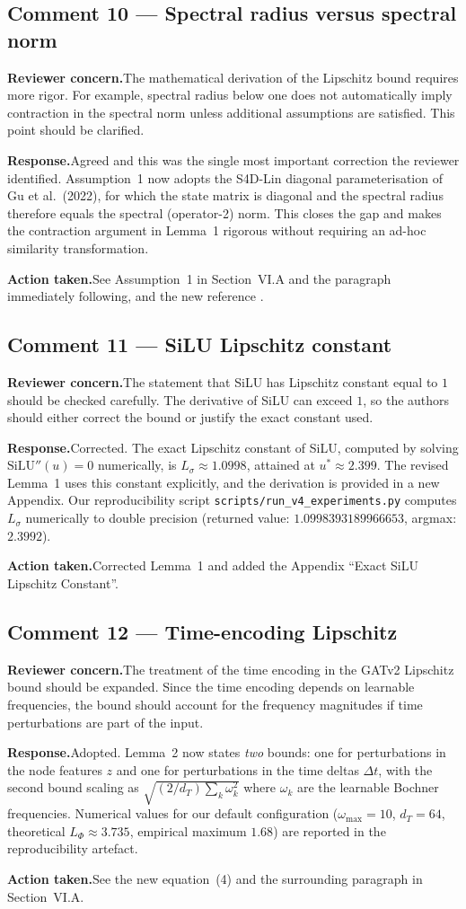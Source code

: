 \documentclass[11pt,a4paper]{article}
\newcommand{\concern}[1]{\noindent\textbf{Reviewer concern.}\quad #1\par\vspace{0.3em}}
\newcommand{\response}[1]{\noindent\textbf{Response.}\quad #1\par\vspace{0.3em}}
\newcommand{\action}[1]{\noindent\textbf{Action taken.}\quad #1\par\vspace{0.8em}}
\begin{document}
\subsection*{Comment 10 --- Spectral radius versus spectral norm}
\concern{The mathematical derivation of the Lipschitz bound requires more rigor. For example, spectral radius below one does not automatically imply contraction in the spectral norm unless additional assumptions are satisfied. This point should be clarified.}
\response{Agreed and this was the single most important correction the reviewer identified. Assumption~1 now adopts the S4D-Lin diagonal parameterisation of Gu et al.\ (2022), for which the state matrix is diagonal and the spectral radius therefore equals the spectral (operator-2) norm. This closes the gap and makes the contraction argument in Lemma~1 rigorous without requiring an ad-hoc similarity transformation.}
\action{See Assumption~1 in Section~VI.A and the paragraph immediately following, and the new reference \cite{Gu2022S4D}.}

\subsection*{Comment 11 --- SiLU Lipschitz constant}
\concern{The statement that SiLU has Lipschitz constant equal to $1$ should be checked carefully. The derivative of SiLU can exceed $1$, so the authors should either correct the bound or justify the exact constant used.}
\response{Corrected. The exact Lipschitz constant of SiLU, computed by solving $\mathrm{SiLU}''(u)=0$ numerically, is $L_{\sigma}\approx 1.0998$, attained at $u^{*}\approx 2.399$. The revised Lemma~1 uses this constant explicitly, and the derivation is provided in a new Appendix. Our reproducibility script \texttt{scripts/run\_v4\_experiments.py} computes $L_{\sigma}$ numerically to double precision (returned value: $1.0998393189966653$, argmax: $2.3992$).}
\action{Corrected Lemma~1 and added the Appendix ``Exact SiLU Lipschitz Constant''.}

\subsection*{Comment 12 --- Time-encoding Lipschitz}
\concern{The treatment of the time encoding in the GATv2 Lipschitz bound should be expanded. Since the time encoding depends on learnable frequencies, the bound should account for the frequency magnitudes if time perturbations are part of the input.}
\response{Adopted. Lemma~2 now states \emph{two} bounds: one for perturbations in the node features $z$ and one for perturbations in the time deltas $\Delta t$, with the second bound scaling as $\sqrt{(2/d_{T})\sum_{k}\omega_{k}^{2}}$ where $\omega_{k}$ are the learnable Bochner frequencies. Numerical values for our default configuration ($\omega_{\max}=10$, $d_{T}=64$, theoretical $L_{\Phi}\approx 3.735$, empirical maximum $1.68$) are reported in the reproducibility artefact.}
\action{See the new equation~(4) and the surrounding paragraph in Section~VI.A.}
\end{document}
